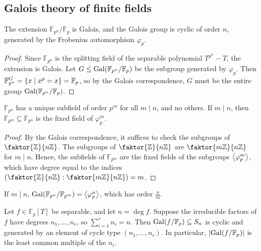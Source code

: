 \subsection{Galois theory of finite fields}
\begin{theorem}
	The extension \( \mathbb F_{p^n} / \mathbb F_p \) is Galois, and the Galois group is cyclic of order \( n \), generated by the Frobenius automorphism \( \varphi_p \).
\end{theorem}
\begin{proof}
	Since \( \mathbb F_{p^n} \) is the splitting field of the separable polynomial \( T^{p^n} - T \), the extension is Galois.
	Let \( G \leq \operatorname{Gal}(\mathbb F_{p^n} / \mathbb F_p) \) be the subgroup generated by \( \varphi_p \).
	Then \( \mathbb F_{p^n}^G = \qty{x \mid x^p = x} = \mathbb F_p \), so by the Galois correspondence, \( G \) must be the entire group \( \operatorname{Gal}(\mathbb F_{p^n} / \mathbb F_p) \).
\end{proof}
\begin{theorem}
	\( \mathbb F_{p^n} \) has a unique subfield of order \( p^m \) for all \( m \mid n \), and no others.
	If \( m \mid n \), then \( \mathbb F_{p^m} \subseteq \mathbb F_{p^n} \) is the fixed field of \( \varphi_p^m \).
\end{theorem}
\begin{proof}
	By the Galois correspondence, it suffices to check the subgroups of \( \faktor{\mathbb Z}{n\mathbb Z} \).
	The subgroups of \( \faktor{\mathbb Z}{n\mathbb Z} \) are \( \faktor{m\mathbb Z}{n\mathbb Z} \) for \( m \mid n \).
	Hence, the subfields of \( \mathbb F_{p^m} \) are the fixed fields of the subgroups \( \left\langle{} \varphi_p^m \right\rangle \), which have degree equal to the indices \( \qty(\faktor{\mathbb Z}{n\mathbb Z} : \faktor{m\mathbb Z}{n\mathbb Z}) = m \).
\end{proof}
\begin{remark}
	If \( m \mid n \), \( \operatorname{Gal}(\mathbb F_{p^n} / \mathbb F_{p^m}) = \left\langle{} \varphi_p^n \right\rangle \), which has order \( \frac{n}{m} \).
\end{remark}
\begin{theorem}
	Let \( f \in \mathbb F_p[T] \) be separable, and let \( n = \deg f \).
	Suppose the irreducible factors of \( f \) have degrees \( n_1, \dots, n_r \), so \( \sum_{i=1}^r n_i = n \).
	Then \( \operatorname{Gal}(f/\mathbb F_p) \subseteq S_n \) is cyclic and generated by an element of cycle type \( (n_1, \dots, n_r) \).
	In particular, \( \abs{\operatorname{Gal}(f/\mathbb F_p)} \) is the least common multiple of the \( n_i \).
\end{theorem}

